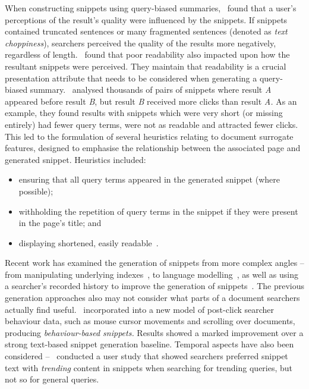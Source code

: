 When constructing snippets using query-biased summaries,~\cite{rose2007snippet_attributes} found that a user's perceptions of the result's quality were influenced by the snippets. If snippets contained truncated sentences or many fragmented sentences (denoted as \emph{text choppiness}), searchers perceived the quality of the results more negatively, regardless of length.~\cite{kanungo2009snippet_readability} found that poor readability also impacted upon how the resultant snippets were perceived. They maintain that readability is a crucial presentation attribute that needs to be considered when generating a query-biased summary.~\cite{clarke2007caption_features} analysed thousands of pairs of snippets where result \emph{A} appeared before result \emph{B}, but result \emph{B} received more clicks than result \emph{A.} As an example, they found results with snippets which were very short (or missing entirely) had fewer query terms, were not as readable and attracted fewer clicks. This led to the formulation of several heuristics relating to document surrogate features, designed to emphasise the relationship between the associated page and generated snippet. Heuristics included:

\begin{itemize}
    \item{ensuring that all query terms appeared in the generated snippet (where possible);}
    \item{withholding the repetition of query terms in the snippet if they were present in the page's title; and}
    \item{displaying shortened, easily readable~.}
\end{itemize}

Recent work has examined the generation of snippets from more complex angles -- from manipulating underlying indexes~\citep{turpin2007fast_snippets, bast2014snippet_generation}, to language modelling~\citep{li2010snippet_extraction, he2012bridging}, as well as using a searcher's recorded history to improve the generation of snippets~\citep{ageev2013summaries, savenkov2011search}. The previous generation approaches also may not consider what parts of a document searchers actually find useful.~\cite{ageev2013summaries} incorporated into a new model of post-click searcher behaviour data, such as mouse cursor movements and scrolling over documents, producing \emph{behaviour-based snippets.} Results showed a marked improvement over a strong text-based snippet generation baseline. Temporal aspects have also been considered --~\cite{svore2012temporal_snippets} conducted a user study that showed searchers preferred snippet text with \emph{trending} content in snippets when searching for trending queries, but not so for general queries.

